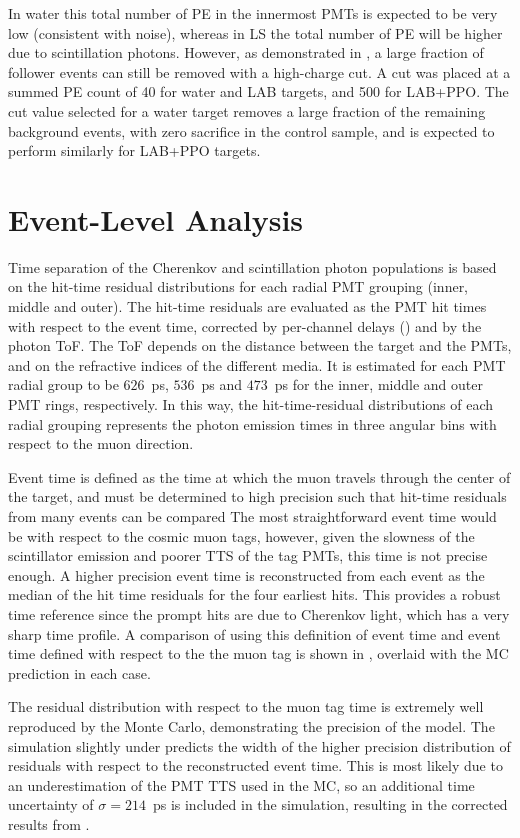 In water this total number of PE in the innermost PMTs is expected to be very low (consistent with noise), whereas in LS the total number of PE will be higher due to scintillation photons.  
However, as demonstrated in , a large fraction of follower events can still be removed with a high-charge cut.   
A cut was placed at a summed PE count of 40 for water and LAB targets, and 500 for LAB+PPO.  
The cut value selected for a water target removes a large fraction of the remaining background events, with zero sacrifice in the control sample, and is expected to perform similarly for LAB+PPO targets.

\section{Event-Level Analysis}\label{s:recon}

Time separation of the Cherenkov and scintillation photon populations is based on the hit-time residual distributions for each radial PMT grouping (inner, middle and outer).  
The hit-time residuals are evaluated as the PMT hit times with respect to the event time, corrected by per-channel delays () and by the photon ToF.  
The ToF depends on the distance between the target and the PMTs, and on the refractive indices of the different media. 
It is estimated for each PMT radial group to be $626$~ps, $536$~ps and $473$~ps for the inner, middle and outer PMT rings, respectively.
In this way, the hit-time-residual distributions of each radial grouping represents the photon emission times in three angular bins with respect to the muon direction.

Event time is defined as the time at which the muon travels through the center of the target, and must be determined to high precision such that hit-time residuals from many events can be compared
The most straightforward event time would be with respect to the cosmic muon tags, however, given the slowness of the scintillator emission and poorer TTS of the tag PMTs, this time is not precise enough.
A higher precision event time is reconstructed from each event as the median of the hit time residuals for the four earliest hits.
This provides a robust time reference since the prompt hits are due to Cherenkov light, which has a very sharp time profile.
A comparison of using this definition of event time and event time defined with respect to the the muon tag is shown in , overlaid with the MC prediction in each case.  

The residual distribution with respect to the muon tag time is extremely well reproduced by the Monte Carlo, demonstrating the precision of the model.
The simulation slightly under predicts the width of the higher precision distribution of residuals with respect to the reconstructed event time.  
This is most likely due to an underestimation of the PMT TTS used in the MC, so an additional time uncertainty of $\sigma=214$~ps is included in the simulation, resulting in the corrected results from .

